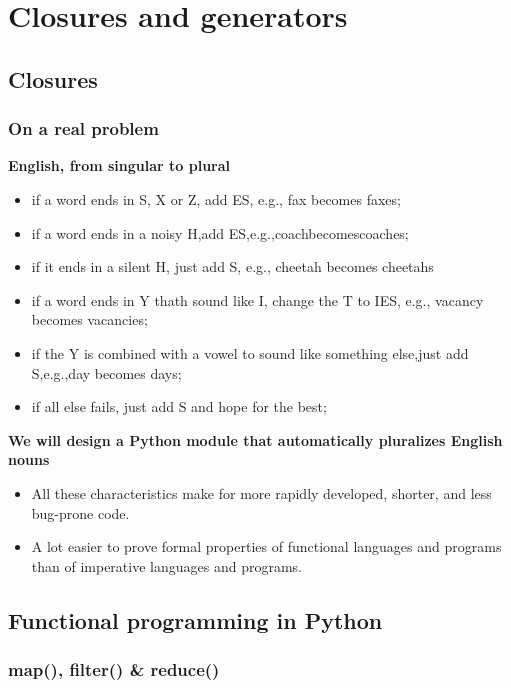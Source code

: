 \section{Closures and generators}

\subsection{Closures}

\subsubsection{On a real problem}

\textbf{English, from singular to plural}
\begin{itemize}
	\item if a word ends in S, X or Z, add ES, e.g., fax becomes faxes;
	\item if a word ends in a noisy H,add ES,e.g.,coachbecomescoaches;
	\item if it ends in a silent H, just add S, e.g., cheetah becomes cheetahs
	\item if a word ends in Y thath sound like I, change the T to IES, e.g., vacancy becomes vacancies;
	\item if the Y is combined with a vowel to sound like something else,just  add S,e.g.,day becomes days;
	\item if all else fails, just add S and hope for the best;
\end{itemize}

\textbf{We will design a Python module that automatically pluralizes English nouns}



\begin{itemize}
	\item All these characteristics make for more rapidly developed, shorter, and less bug-prone code.
	\item A lot easier to prove formal properties of functional languages and programs than of imperative languages and programs.
\end{itemize}

\subsection{Functional programming in Python}

\subsubsection{map(), filter() \& reduce()}

